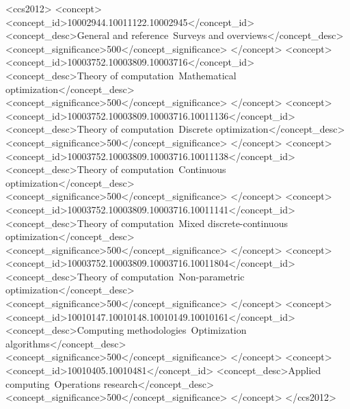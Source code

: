 
\begin{CCSXML}
    <ccs2012>
    <concept>
        <concept_id>10002944.10011122.10002945</concept_id>
        <concept_desc>General and reference~Surveys and overviews</concept_desc>
        <concept_significance>500</concept_significance>
    </concept>
    <concept>
        <concept_id>10003752.10003809.10003716</concept_id>
        <concept_desc>Theory of computation~Mathematical optimization</concept_desc>
        <concept_significance>500</concept_significance>
    </concept>
    <concept>
        <concept_id>10003752.10003809.10003716.10011136</concept_id>
        <concept_desc>Theory of computation~Discrete optimization</concept_desc>
        <concept_significance>500</concept_significance>
    </concept>
    <concept>
        <concept_id>10003752.10003809.10003716.10011138</concept_id>
        <concept_desc>Theory of computation~Continuous optimization</concept_desc>
        <concept_significance>500</concept_significance>
    </concept>
    <concept>
        <concept_id>10003752.10003809.10003716.10011141</concept_id>
        <concept_desc>Theory of computation~Mixed discrete-continuous optimization</concept_desc>
        <concept_significance>500</concept_significance>
    </concept>
    <concept>
        <concept_id>10003752.10003809.10003716.10011804</concept_id>
        <concept_desc>Theory of computation~Non-parametric optimization</concept_desc>
        <concept_significance>500</concept_significance>
    </concept>
    <concept>
        <concept_id>10010147.10010148.10010149.10010161</concept_id>
        <concept_desc>Computing methodologies~Optimization algorithms</concept_desc>
        <concept_significance>500</concept_significance>
    </concept>
    <concept>
        <concept_id>10010405.10010481</concept_id>
        <concept_desc>Applied computing~Operations research</concept_desc>
        <concept_significance>500</concept_significance>
    </concept>
    </ccs2012>
\end{CCSXML}


